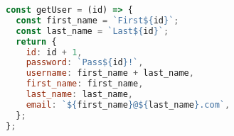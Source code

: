 \begin{lstlisting}[language=JavaScript,caption={K6 Get user function},breaklines=true,label={lst:k6GetUser}]
const getUser = (id) => {
  const first_name = `First${id}`;
  const last_name = `Last${id}`;
  return {
    id: id + 1,
    password: `Pass${id}!`,
    username: first_name + last_name,
    first_name: first_name,
    last_name: last_name,
    email: `${first_name}@${last_name}.com`,
  };
};
\end{lstlisting}

